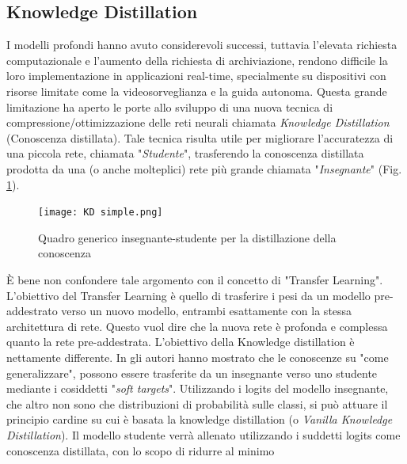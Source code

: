 \subsection{Knowledge Distillation}\label{KD_distill}
I modelli profondi hanno avuto considerevoli successi, tuttavia l'elevata richiesta 
computazionale e l'aumento della richiesta di archiviazione, rendono 
difficile la loro implementazione in applicazioni real-time, specialmente su 
dispositivi con risorse limitate come la videosorveglianza e la guida autonoma. 
Questa grande limitazione ha aperto le porte allo sviluppo di una 
nuova tecnica di compressione/ottimizzazione delle reti neurali chiamata 
\emph{Knowledge Distillation} (Conoscenza distillata). Tale tecnica risulta utile 
per migliorare l'accuratezza di una piccola rete, chiamata "\emph{Studente}", trasferendo 
la conoscenza distillata prodotta da una (o anche molteplici) rete 
più grande chiamata "\emph{Insegnante}" (Fig. \ref{KD_simple}).
\begin{figure}
    \centering
    \texttt{[image: KD simple.png]}
    \centering
    \caption{Quadro generico insegnante-studente per la distillazione della conoscenza}
    \label{KD_simple}
\end{figure}
È bene non confondere tale 
argomento con il concetto di "Transfer Learning". L'obiettivo del Transfer 
Learning è quello di trasferire i pesi da un modello pre-addestrato verso 
un nuovo modello, entrambi esattamente con la stessa architettura di rete. 
Questo vuol dire che la nuova rete è profonda e complessa quanto la rete pre-addestrata.
L'obiettivo della Knowledge distillation è nettamente differente.
In \cite{hinton2015distilling} gli autori hanno mostrato che le conoscenze su "come generalizzare", 
possono essere trasferite da un insegnante verso uno studente mediante i 
cosiddetti "\emph{soft targets}". Utilizzando i logits del modello insegnante, che 
altro non sono che distribuzioni di probabilità sulle classi, si può attuare 
il principio cardine su cui è basata la knowledge distillation (o \emph{Vanilla 
Knowledge Distillation}). Il modello studente verrà allenato utilizzando i 
suddetti logits come conoscenza distillata, con lo scopo di ridurre al minimo 
